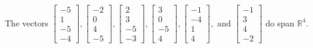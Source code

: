 \begin{exercise}
\begin{exerciseStatement}
  \end{exerciseStatement}
  \begin{exerciseAnswer}
   The vectors \(\left[\begin{array}{r}
-5 \\
1 \\
-5 \\
-4
\end{array}\right] , \left[\begin{array}{r}
-2 \\
0 \\
4 \\
-5
\end{array}\right] , \left[\begin{array}{r}
2 \\
3 \\
-5 \\
-3
\end{array}\right] , \left[\begin{array}{r}
3 \\
0 \\
-5 \\
4
\end{array}\right] , \left[\begin{array}{r}
-1 \\
-4 \\
1 \\
4
\end{array}\right] , \text{ and } \left[\begin{array}{r}
-1 \\
3 \\
4 \\
-2
\end{array}\right]\) 
  	 do  
	span \(\mathbb{R}^4\).
  


  \end{exerciseAnswer}
\end{exercise}